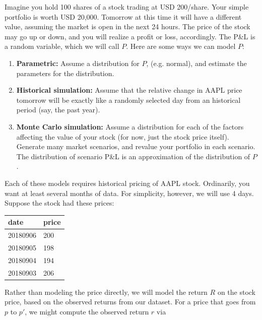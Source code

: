 \documentclass{report}
\numberwithin{problem}{chapter} %
\newcommand{\pnl}{P\&L }
\begin{document}
Imagine you hold 100 shares of a stock trading at USD 200/share. Your simple portfolio is worth USD 20,000. Tomorrow at this time it will have a different value, assuming the market is open in the next 24 hours. The price of the stock may go up or down, and you will realize a profit or loss, accordingly. The \pnl is a random variable, which we will call $P$. Here are some ways we can model $P$:
\begin{enumerate}
\item{{\bf Parametric:} Assume a distribution for $P$, (e.g. normal), and estimate the parameters for the distribution. }
\item{{\bf Historical simulation:} Assume that the relative change in AAPL price tomorrow will be exactly like a randomly selected day from an historical period (say, the past year). }
\item{{\bf Monte Carlo simulation:} Assume a distribution for each of the factors affecting the value of your stock (for now, just the stock price itself). Generate many market scenarios, and revalue your portfolio in each scenario. The distribution of scenario \pnl is an approximation of  the distribution of $P$.}
\end{enumerate}

Each of these models requires historical pricing of AAPL stock. Ordinarily, you want at least several months of data. For simplicity, however, we will use 4 days. Suppose the stock had these prices:

\begin{center}
\begin{tabular}{lr}
\textbf{date}                  & \textbf{price}                    \\ \hline
\multicolumn{1}{|l|}{20180906} & \multicolumn{1}{l|}{200}   \\ \hline
\multicolumn{1}{|l|}{20180905} & \multicolumn{1}{l|}{198}   \\ \hline
\multicolumn{1}{|l|}{20180904} & \multicolumn{1}{l|}{194}  \\ \hline
\multicolumn{1}{|l|}{20180903} & \multicolumn{1}{l|}{206}      \\ \hline
\end{tabular}
\end{center}

Rather than modeling the price directly, we will model the return $R$ on the stock price, based on the observed returns from our dataset. For a price that goes from $p$ to $p'$, we might compute the observed return $r$ via
\end{document}

